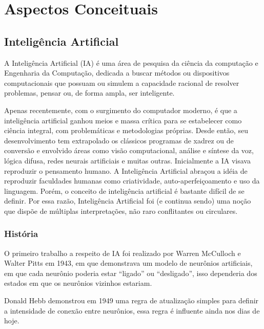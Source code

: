 \chapter{Aspectos Conceituais}

\section{Inteligência Artificial}


A Inteligência Artificial (IA) é uma área de pesquisa da ciência da computação e Engenharia da Computação, dedicada a buscar métodos ou dispositivos computacionais que possuam ou simulem a capacidade racional de resolver problemas, pensar ou, de forma ampla, ser inteligente.

Apenas recentemente, com o surgimento do computador moderno, é que a inteligência artificial ganhou meios e massa crítica para se estabelecer como ciência integral, com problemáticas e metodologias próprias. Desde então, seu desenvolvimento tem extrapolado os clássicos programas de xadrez ou de conversão e envolvido áreas como visão computacional, análise e síntese da voz, lógica difusa, redes neurais artificiais e muitas outras.
Inicialmente a IA visava reproduzir o pensamento humano. A Inteligência Artificial abraçou a idéia de reproduzir faculdades humanas como criatividade, auto-aperfeiçoamento e uso da linguagem. Porém, o conceito de inteligência artificial é bastante difícil de se definir. Por essa razão, Inteligência Artificial foi (e continua sendo) uma noção que dispõe de múltiplas interpretações, não raro conflitantes ou circulares.

\subsection{História}

O primeiro trabalho a respeito de IA foi realizado por Warren McCulloch e Walter Pitts em 1943, em que demonstrava um modelo de neurônios artificiais, em que cada neurônio poderia estar ``ligado'' ou ``desligado'', isso dependeria dos estados em que os neurônios vizinhos estariam.~\cite{livro_russel}

Donald Hebb demonstrou em 1949 uma regra de atualização simples para definir a intensidade de conexão entre neurônios, essa regra é influente ainda nos dias de hoje.~\cite{livro_russel}


